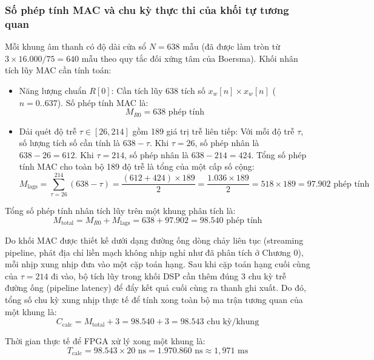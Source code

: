 \subsubsection*{Số phép tính MAC và chu kỳ thực thi của khối tự tương quan}
Mỗi khung âm thanh có độ dài cửa sổ $N = 638$ mẫu (đã được làm tròn từ $3 \times 16.000 / 75 = 640$ mẫu theo quy tắc đối xứng tâm của Boersma). Khối nhân tích lũy MAC cần tính toán:
\begin{itemize}[leftmargin=1.5em, itemsep=2pt]
    \item Năng lượng chuẩn $R[0]$: Cần tích lũy $638$ tích số $x_w[n] \times x_w[n]$ ($n = 0..637$). Số phép tính MAC là:
    \begin{equation}
    M_{R0} = 638\text{ phép tính}
    \end{equation}
    \item Dải quét độ trễ $\tau \in [26, 214]$ gồm 189 giá trị trễ liên tiếp: Với mỗi độ trễ $\tau$, số lượng tích số cần tính là $638 - \tau$. Khi $\tau = 26$, số phép nhân là $638 - 26 = 612$. Khi $\tau = 214$, số phép nhân là $638 - 214 = 424$. Tổng số phép tính MAC cho toàn bộ 189 độ trễ là tổng của một cấp số cộng:
    \begin{equation}
    M_{\text{lags}} = \sum_{\tau=26}^{214} (638 - \tau) = \frac{(612 + 424) \times 189}{2} = \frac{1.036 \times 189}{2} = 518 \times 189 = 97.902\text{ phép tính}
    \end{equation}
\end{itemize}

Tổng số phép tính nhân tích lũy trên một khung phân tích là:
\begin{equation}
M_{\text{total}} = M_{R0} + M_{\text{lags}} = 638 + 97.902 = 98.540\text{ phép tính}
\end{equation}

Do khối MAC được thiết kế dưới dạng đường ống dòng chảy liên tục (streaming pipeline, phát địa chỉ liền mạch không nhịp nghỉ như đã phân tích ở Chương 0), mỗi nhịp xung nhịp đưa vào một cặp toán hạng. Sau khi cặp toán hạng cuối cùng của $\tau = 214$ đi vào, bộ tích lũy trong khối DSP cần thêm đúng 3 chu kỳ trễ đường ống (pipeline latency) để đẩy kết quả cuối cùng ra thanh ghi xuất. Do đó, tổng số chu kỳ xung nhịp thực tế để tính xong toàn bộ ma trận tương quan của một khung là:
\begin{equation}
C_{\text{calc}} = M_{\text{total}} + 3 = 98.540 + 3 = 98.543\text{ chu kỳ/khung}
\end{equation}

Thời gian thực tế để FPGA xử lý xong một khung là:
\begin{equation}
T_{\text{calc}} = 98.543 \times 20\text{ ns} = 1.970.860\text{ ns} \approx 1{,}971\text{ ms}
\end{equation}

